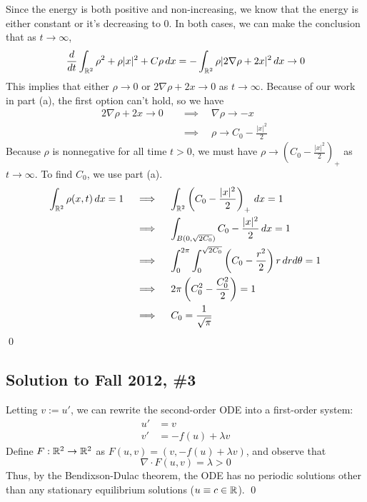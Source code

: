 Since the energy is both positive and non-increasing, we know that the energy is either constant or it's decreasing to 0. In both cases, we can make the conclusion that as $t \to \infty$,
$$ \frac{d}{dt} \int_{\mathbb{R}^2} \rho^2 + \rho|x|^2 + C \rho \, dx = -\int_{\mathbb{R}^2} \rho |2 \nabla \rho + 2x|^2 \, dx \to 0$$
This implies that either $\rho \to 0$ or $2 \nabla \rho + 2x \to 0$ as $t \to \infty$. Because of our work in part (a), the first option can't hold, so we have\
\begin{align*}
2 \nabla \rho + 2x \to 0 \quad &\implies \quad \nabla \rho \to -x \\
&\implies \quad \rho \to C_0 -\frac{|x|^2}{2}\
\end{align*}
Because $\rho$ is nonnegative for all time $t>0$, we must have $ \rho \to \left( C_0 - \frac{|x|^2}{2} \right)_+$ as $t \to \infty$. To find $C_0$, we use part (a).
\begin{align*}
\int_{\mathbb{R}^2} \rho(x,t) \, dx = 1 \quad &\implies \quad \int_{\mathbb{R}^2} \left( C_0 - \frac{|x|^2}{2} \right)_+ \, dx = 1 \\
&\implies \quad \int_{B(0,\sqrt{2C_0})} C_0 - \frac{|x|^2}{2} \, dx = 1 \\
&\implies \quad \int_0^{2\pi} \int_0^{\sqrt{2C_0}} \left( C_0 - \frac{r^2}{2} \right) r \, dr d\theta = 1\\
&\implies \quad 2 \pi \left( C_0^2 - \frac{C_0^2}{2} \right) = 1 \\
&\implies \quad C_0 = \frac{1}{\sqrt{\pi}}
\end{align*}
\hfill \qed











\subsection*{Solution to Fall 2012, \#3}
\label{F12Q3}

Letting $v := u'$, we can rewrite the second-order ODE into a first-order system:
\begin{align*}
u' &= v \\
v' &= -f(u) + \lambda v
\end{align*}
Define $F : \mathbb{R}^2 \to \mathbb{R}^2$ as $F(u,v) = (v, -f(u) + \lambda v)$, and observe that
$$ \nabla \cdot F(u,v) = \lambda > 0 $$
Thus, by the Bendixson-Dulac theorem, the ODE has no periodic solutions other than any stationary equilibrium solutions ($u \equiv c \in \mathbb{R}$). \hfill \qed












